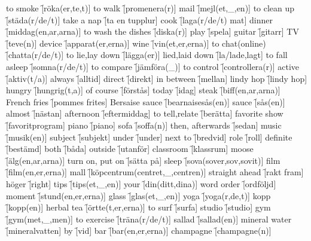 \begin{questions}
\begin{multicols}{2}
        \question to smoke \f[röka(er,te,t)]
        \question to walk \f[promenera(r)]
        \question mail \f[mejl(et,\_,en)]
        \question to clean up \f[städa(r/de/t)]
        \question take a nap \f[ta en tupplur]
        \question cook \f[laga(r/de/t) mat]
        \question dinner \f[middag(en,ar,arna)]
        \question to wash the dishes \f[diska(r)]
        \question play \f[spela]
        \question guitar \f[gitarr]
        \question TV \f[teve(n)]
        \question device \f[apparat(er,erna)]
        \question wine \f[vin(et,er,erna)]
        \question to chat(online) \f[chatta(r/de/t)]
        \question to lie,lay down \f[lägga(er)]
        \question lied,laid down \f[la/lade,lagt]
        \question to fall asleep \f[somna(r/de/t)]
        \question to compare \f[jämföra(\_)]
        \question to control \f[controllera(r)]
        \question active \f[aktiv(t/a)]
        \question always \f[alltid]
        \question direct \f[direkt]
        \question in between \f[mellan]
        \question lindy hop \f[lindy hop]
        \question hungry \f[hungrig(t,a)]
        \question of course \f[förstås]
        \question today \f[idag]
        \question steak \f[biff(en,ar,arna)]
        \question French fries \f[pommes frites]
        \question Bersaise sauce \f[bearnaisesås(en)]
        \question sauce \f[sås(en)]
        \question almost \f[nästan]
        \question afternoon \f[eftermiddag]
        \question to tell,relate \f[berätta]
        \question favorite show \f[favoritprogram]
        \question piano \f[piano]
        \question sofa \f[soffa(n)]
        \question then, afterwards \f[sedan]
        \question music \f[musik(en)]
        \question subject \f[subjekt]
        \question under \f[under]
        \question next to \f[bredvid]
        \question role \f[roll]
        \question definite \f[bestämd]
        \question both \f[båda]
        \question outside \f[utanför]
        \question classroom \f[klassrum]
        \question moose \f[älg(en,ar,arna)]
        \question turn on, put on \f[sätta på]
        \question sleep \f[sova(sover,sov,sovit)]
        \question film \f[film(en,er,erna)]
        \question mall \f[köpcentrum(centret,\_,centren)]
        \question straight ahead \f[rakt fram]
        \question höger \f[right]
        \question tips \f[tips(et,\_,en)]
        \question your \f[din(ditt,dina)]
        \question word order \f[ordföljd]
        \question moment \f[stund(en,er,erna)]
        \question glass \f[glas(et,\_,en)]
        \question yoga \f[yoga(r,de,t)]
        \question kopp \f[kopp(en)]
        \question herbal tea \f[örtte(t,er,erna)]
        \question to surf \f[surfa]
        \question studio \f[studio]
        \question gym \f[gym(met,\_,men)]
        \question to exercise \f[träna(r/de/t)]
        \question sallad \f[sallad(en)]
        \question mineral water \f[mineralvatten]
        \question by \f[vid]
        \question bar \f[bar(en,er,erna)]
        \question champagne \f[champagne(n)]
    \end{multicols}
\end{questions}
